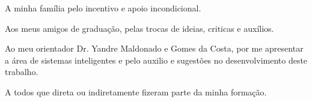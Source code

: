
\begin{agradecimentos}[AGRADECIMENTOS]

A minha família pelo incentivo e apoio incondicional.
\par Aos meus amigos de graduação, pelas trocas de ideias, criticas e auxílios.
\par Ao meu orientador Dr. Yandre Maldonado e Gomes da Costa, por me apresentar a área de sistemas inteligentes e pelo auxilio e sugestões no desenvolvimento deste trabalho.
\par A todos que direta ou indiretamente fizeram parte da minha formação. 

\end{agradecimentos}
